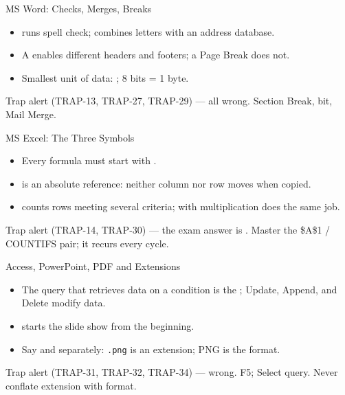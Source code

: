 \documentclass[aspectratio=169]{beamer}
\begin{document}
\begin{frame}{MS Word: Checks, Merges, Breaks}
  \begin{itemize}
    \item {} runs spell check;  combines letters with an
      address database.
    \item A  enables different headers and footers; a Page
      Break does not.
    \item Smallest unit of data: ; 8 bits = 1 byte.
  \end{itemize}
  \begin{alertblock}{Trap alert (TRAP-13, TRAP-27, TRAP-29)}
     --- all wrong. Section Break, bit, Mail Merge.
  \end{alertblock}
\end{frame}

\begin{frame}{MS Excel: The Three Symbols}
  \begin{itemize}
    \item Every formula must start with \key{=}.
    \item {} is an absolute reference: neither column nor row moves
      when copied.
    \item {} counts rows meeting several criteria;
       with multiplication does the same job.
  \end{itemize}
  \begin{alertblock}{Trap alert (TRAP-14, TRAP-30)}
     --- the exam answer is \key{=}.
    Master the \$A\$1 / COUNTIFS pair; it recurs every cycle.
  \end{alertblock}
\end{frame}

\begin{frame}{Access, PowerPoint, PDF and Extensions}
  \begin{itemize}
    \item The query that retrieves data on a condition is the ; Update, Append, and Delete modify data.
    \item {} starts the slide show from the beginning.
    \item Say  and  separately: \texttt{.png} is an
      extension; PNG is the format.
  \end{itemize}
  \begin{alertblock}{Trap alert (TRAP-31, TRAP-32, TRAP-34)}
     --- wrong. F5; Select
    query. Never conflate extension with format.
  \end{alertblock}
\end{frame}
\end{document}
